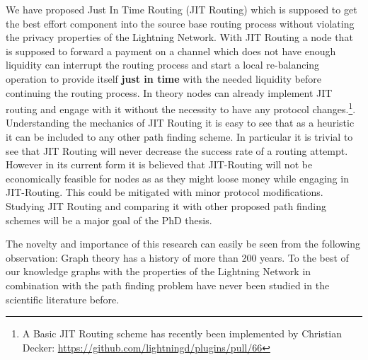 \documentclass[a4paper]{paper}
\begin{document}
We have proposed Just In Time Routing (JIT Routing) \cite{pickhardt2019jit} which is supposed to get the best effort component into the source base routing process without violating the privacy properties of the Lightning Network.
With JIT Routing a node that is supposed to forward a payment on a channel which does not have enough liquidity can interrupt the routing process and start a local re-balancing operation to provide itself \textbf{just in time} with the needed liquidity before continuing the routing process.
In theory nodes can already implement JIT routing and engage with it without the necessity to have any protocol changes.\footnote{A Basic JIT Routing scheme has recently been implemented by Christian Decker: \url{https://github.com/lightningd/plugins/pull/66}}.
Understanding the mechanics of JIT Routing it is easy to see that as a heuristic it can be included to any other path finding scheme.
In particular it is trivial to see that JIT Routing will never decrease the success rate of a routing attempt.
However in its current form it is believed that JIT-Routing will not be economically feasible for nodes as as they might loose money while engaging in JIT-Routing. This could be mitigated with minor protocol modifications. Studying JIT Routing and comparing it with other proposed path finding schemes will be a major goal of the PhD thesis. 

The novelty and importance of this research can easily be seen from the following observation:
Graph theory has a history of more than 200 years.
To the best of our knowledge graphs with the properties of the Lightning Network in combination with the path finding problem have never been studied in the scientific literature before.
\end{document}
